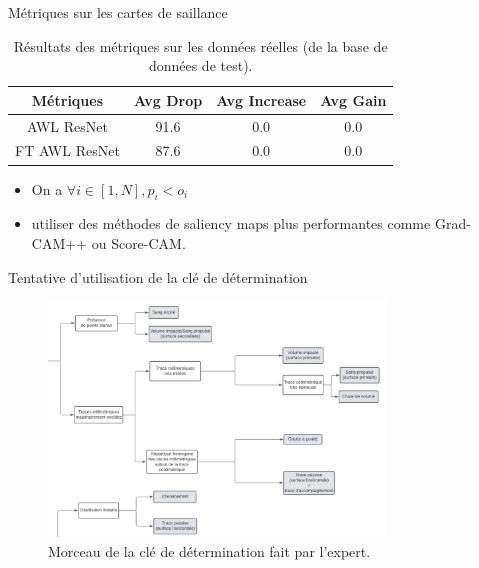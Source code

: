 \documentclass[11pt]{beamer}
\begin{document}
\begin{frame}{Métriques sur les cartes de saillance}
    \begin{table}[ht]
        \centering
        \begin{tabular}{cccc}
            \toprule
            Métriques & Avg Drop & Avg Increase & Avg Gain \\
            \midrule
            AWL ResNet & 91.6 & 0.0& 0.0\\
            FT AWL ResNet & 87.6 & 0.0 & 0.0\\
            \bottomrule
            \end{tabular}
        \caption{Résultats des métriques sur les données réelles (de la base de données de test).}
        \label{tab:saliency_results}
    \end{table}

    \begin{itemize}
        \item On a $\forall i \in [1, N], p_i < o_i$
        \item utiliser des méthodes de saliency maps plus performantes comme Grad-CAM++ ou Score-CAM.
    \end{itemize}
\end{frame}


\begin{frame}{Tentative d'utilisation de la clé de détermination}
    \begin{figure}[ht]
        \centering
        \includegraphics[width=0.8\textwidth]{../ressources/morceau_cle_determination.png}
        \caption{Morceau de la clé de détermination fait par l'expert.}
    \end{figure}
\end{frame}
\end{document}

